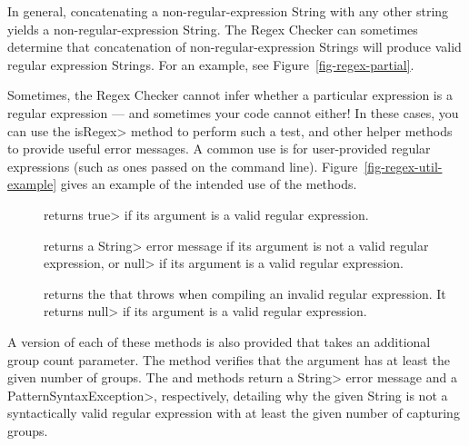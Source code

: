 In general, concatenating a non-regular-expression String with any other
string yields a non-regular-expression String.  The Regex Checker can
sometimes determine that concatenation of non-regular-expression Strings
will produce valid regular expression Strings. For an example, see
Figure~\ref{fig-regex-partial}.



Sometimes, the Regex Checker cannot infer whether a particular expression
is a regular expression --- and sometimes your code cannot either!  In
these cases, you can use the \<isRegex> method to perform such a test, and
other helper methods to provide useful error messages.  A
common use is for user-provided regular expressions (such as ones passed
on the command line).
Figure~\ref{fig-regex-util-example} gives an
example of the intended use of the  methods.

\begin{description}

\item[]
  returns \<true> if its argument is a valid regular expression.

\item[]
  returns a \<String> error message if its argument is not a valid regular
  expression, or \<null> if its argument is a valid regular expression.

\item[]
  returns the
  that 
  throws when compiling an invalid regular expression.  It returns \<null>
  if its argument is a valid regular expression.

\end{description}

A version of each of these methods is also provided that takes
an additional group count parameter. The
 method
verifies that the argument has at least the given number of groups. The
 and
methods return a \<String> error message and a \<Pattern\-Syntax\-Exception>,
respectively, detailing why the given String is not a syntactically valid
regular expression with at least the given number of capturing groups.

